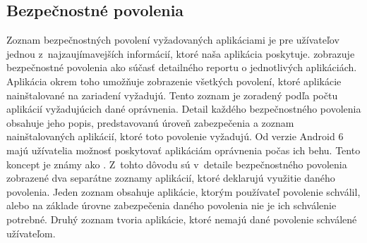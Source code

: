 \subsection{Bezpečnostné povolenia}
Zoznam bezpečnostných povolení vyžadovaných aplikáciami je pre užívateľov jednou z~najzaujímavejších informácií, ktoré naša aplikácia poskytuje.  zobrazuje bezpečnostné povolenia ako súčasť detailného reportu o jednotlivých aplikáciách. Aplikácia okrem toho umožňuje zobrazenie všetkých povolení, ktoré aplikácie nainštalované na zariadení vyžadujú. Tento zoznam je zoradený podľa počtu aplikácií vyžadujúcich dané oprávnenia. Detail každého bezpečnostného povolenia obsahuje jeho popis, predstavovanú úroveň zabezpečenia a zoznam nainštalovaných aplikácií, ktoré toto povolenie vyžadujú. Od verzie Android 6 majú užívatelia možnosť poskytovať aplikáciám oprávnenia počas ich behu. Tento koncept je známy ako . Z~tohto dôvodu sú v~detaile bezpečnostného povolenia zobrazené dva separátne zoznamy aplikácií, ktoré deklarujú využitie daného povolenia. Jeden zoznam obsahuje aplikácie, ktorým používateľ povolenie schválil, alebo na základe úrovne zabezpečenia daného povolenia nie je ich schválenie potrebné. Druhý zoznam tvoria aplikácie, ktoré nemajú dané povolenie schválené užívateľom. \\ \\


